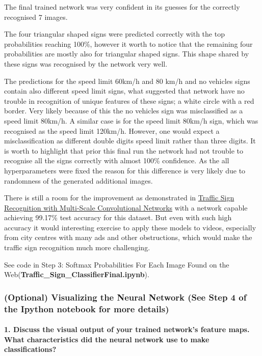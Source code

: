 \documentclass[11pt]{article}
\begin{document}
The final trained network was very confident in its guesses for the
correctly recognised 7 images.

The four triangular shaped signs were predicted correctly with the top
probabilities reaching 100\%, however it worth to notice that the
remaining four probabilities are mostly also for triangular shaped
signs. This shape shared by these signs was recognised by the network
very well.

The predictions for the speed limit 60km/h and 80 km/h and no vehicles
signs contain also different speed limit signs, what suggested that
network have no trouble in recognition of unique features of these
signs; a white circle with a red border. Very likely because of this the
no vehicles sign was misclassified as a speed limit 80km/h. A similar
case is for the speed limit 80km/h sign, which was recognised as the
speed limit 120km/h. However, one would expect a misclassification as
different double digits speed limit rather than three digits. It is
worth to highlight that prior this final run the network had not trouble
to recognise all the signs correctly with almost 100\% confidence. As
the all hyperparameters were fixed the reason for this difference is
very likely due to randomness of the generated additional images.

There is still a room for the improvement as demonstrated in
\href{http://yann.lecun.com/exdb/publis/pdf/sermanet-ijcnn-11.pdf}{Traffic
Sign Recognition with Multi-Scale Convolutional Networks} with a network
capable achieving 99.17\% test accuracy for this dataset. But even with
such high accuracy it would interesting exercise to apply these models
to videos, especially from city centres with many ads and other
obstructions, which would make the traffic sign recognition much more
challenging.

See code in Step 3: Softmax Probabilities For Each Image Found on the
Web(\textbf{Traffic\_Sign\_ClassifierFinal.ipynb}).

\hypertarget{optional-visualizing-the-neural-network-see-step-4-of-the-ipython-notebook-for-more-details}{%
\subsubsection{(Optional) Visualizing the Neural Network (See Step 4 of
the Ipython notebook for more
details)}\label{optional-visualizing-the-neural-network-see-step-4-of-the-ipython-notebook-for-more-details}}

\hypertarget{discuss-the-visual-output-of-your-trained-networks-feature-maps.-what-characteristics-did-the-neural-network-use-to-make-classifications}{%
\paragraph{1. Discuss the visual output of your trained network's
feature maps. What characteristics did the neural network use to make
classifications?}\label{discuss-the-visual-output-of-your-trained-networks-feature-maps.-what-characteristics-did-the-neural-network-use-to-make-classifications}}


    
    
    
    
\end{document}
